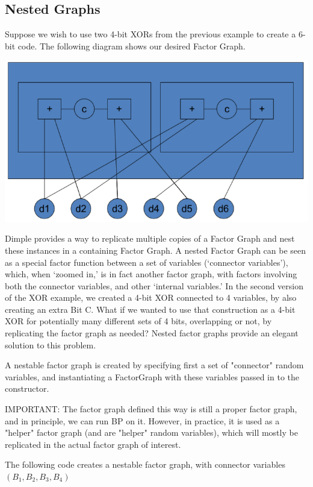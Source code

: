 \subsection{Nested Graphs}
\label{sec:nestedGraphs}
Suppose we wish to use two 4-bit XORs from the previous example to create a 6-bit code.  The following diagram shows our desired Factor Graph.

\includegraphics{images/NestedGraph.png}

Dimple provides a way to replicate multiple copies of a Factor Graph and nest these instances in a containing Factor Graph. A nested Factor Graph can be seen as a special factor function between a set of variables (`connector variables'), which, when `zoomed in,' is in fact another factor graph, with factors involving both the connector variables, and other `internal variables.' In the second version of the XOR example, we created a 4-bit XOR connected to 4 variables, by also creating an extra Bit C. What if we wanted to use that construction as a 4-bit XOR for potentially many different sets of 4 bits, overlapping or not, by replicating the factor graph as needed? Nested factor graphs provide an elegant solution to this problem.

A nestable factor graph is created by specifying first a set  of "connector" random variables, and instantiating a FactorGraph with these variables passed in to the constructor.

IMPORTANT: The factor graph defined this way is still a proper factor graph, and in principle, we can run BP on it. However, in practice, it is used as a "helper" factor graph (and   are "helper" random variables), which will mostly be replicated in the actual factor graph of interest.

The following code creates a nestable factor graph, with connector variables $ (B_1,B_2,B_3,B_4) $

